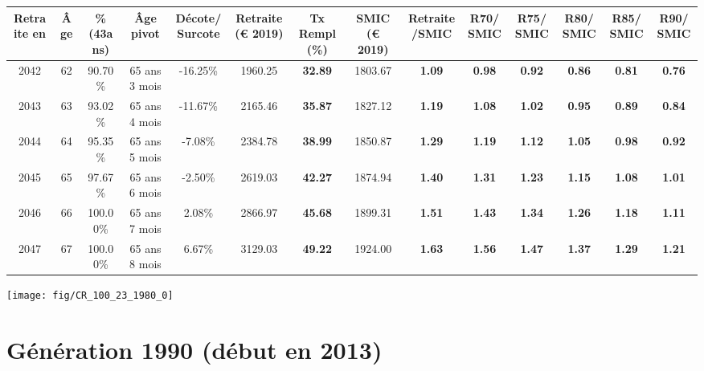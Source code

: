 \begin{adjustbox}{max width=\textwidth} 
\begin{tabular}[htb]{|c|c||c|c|c||c|c||c|c||c|c|c|c|c|} 
\hline 
 Retraite en &  Âge &  \%(43ans) &  Âge pivot &  Décote/Surcote &  Retraite (\euro{} 2019) &  Tx Rempl(\%) &  SMIC (\euro{} 2019) &  Retraite/SMIC &  R70/SMIC &  R75/SMIC &  R80/SMIC &  R85/SMIC &  R90/SMIC \\ 
\hline \hline 
 2042 &  62 &  90.70\% &  65 ans 3 mois &  -16.25\% &  1960.25 &  {\bf 32.89} &  1803.67 &  {\bf 1.09} &  {\bf {\color{red} 0.98}} &  {\bf {\color{red} 0.92}} &  {\bf {\color{red} 0.86}} &  {\bf {\color{red} 0.81}} &  {\bf {\color{red} 0.76}} \\ 
\hline 
 2043 &  63 &  93.02\% &  65 ans 4 mois &  -11.67\% &  2165.46 &  {\bf 35.87} &  1827.12 &  {\bf 1.19} &  {\bf 1.08} &  {\bf 1.02} &  {\bf {\color{red} 0.95}} &  {\bf {\color{red} 0.89}} &  {\bf {\color{red} 0.84}} \\ 
\hline 
 2044 &  64 &  95.35\% &  65 ans 5 mois &  -7.08\% &  2384.78 &  {\bf 38.99} &  1850.87 &  {\bf 1.29} &  {\bf 1.19} &  {\bf 1.12} &  {\bf 1.05} &  {\bf {\color{red} 0.98}} &  {\bf {\color{red} 0.92}} \\ 
\hline 
 2045 &  65 &  97.67\% &  65 ans 6 mois &  -2.50\% &  2619.03 &  {\bf 42.27} &  1874.94 &  {\bf 1.40} &  {\bf 1.31} &  {\bf 1.23} &  {\bf 1.15} &  {\bf 1.08} &  {\bf 1.01} \\ 
\hline 
 2046 &  66 &  100.00\% &  65 ans 7 mois &  2.08\% &  2866.97 &  {\bf 45.68} &  1899.31 &  {\bf 1.51} &  {\bf 1.43} &  {\bf 1.34} &  {\bf 1.26} &  {\bf 1.18} &  {\bf 1.11} \\ 
\hline 
 2047 &  67 &  100.00\% &  65 ans 8 mois &  6.67\% &  3129.03 &  {\bf 49.22} &  1924.00 &  {\bf 1.63} &  {\bf 1.56} &  {\bf 1.47} &  {\bf 1.37} &  {\bf 1.29} &  {\bf 1.21} \\ 
\hline 
\hline 
\end{tabular} 
\end{adjustbox} 
 
 \vspace{0.1cm} 

 {\hspace{-2.2cm}\texttt{[image: fig/CR\_100\_23\_1980\_0]}} 

\newpage 
 
\section{Génération 1990 (début en 2013)\label{CR_100_23_1990_0}} 
 

